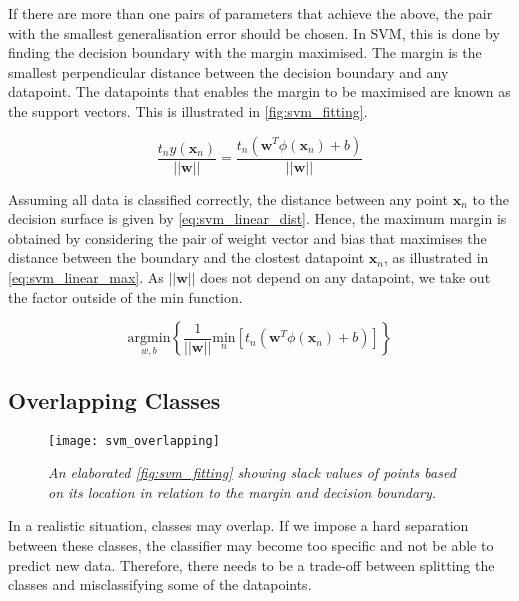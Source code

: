If there are more than one pairs of parameters that achieve the above, the pair with the smallest generalisation error should be chosen. In SVM, this is done by finding the decision boundary with the margin maximised. The margin is the smallest perpendicular distance between the decision boundary and any datapoint. The datapoints that enables the margin to be maximised are known as the support vectors. This is illustrated in \autoref{fig:svm_fitting}.

\begin{equation} \label{eq:svm_linear_dist}
  \frac{t_n y(\mathbf{x}_n)}{||\mathbf{w}||} = \frac{t_n (\mathbf{w}^T \phi(\mathbf{x}_n) + b)}{||\mathbf{w}||}
\end{equation}

Assuming all data is classified correctly, the distance between any point $\mathbf{x}_n$ to the decision surface is given by \autoref{eq:svm_linear_dist}. Hence, the maximum margin is obtained by considering the pair of weight vector and bias that maximises the distance between the boundary and the clostest datapoint $\mathbf{x}_n$, as illustrated in \autoref{eq:svm_linear_max}. As $||\mathbf{w}||$ does not depend on any datapoint, we take out the factor outside of the $\mathrm{min}$ function. 

\begin{equation} \label{eq:svm_linear_max}
  \underset{w,b}{\mathrm{argmin}} \left \{ \frac{1}{||\mathbf{w}||} \underset{n}{\mathrm{min}} \left [ t_n \left (\mathbf{w}^T \phi \left (\mathbf{x}_n \right) + b \right) \right ] \right \} 
\end{equation}

\subsection{Overlapping Classes}

\begin{figure}[H]
  \centering
  \texttt{[image: svm\_overlapping]}
  \caption{\textit{An elaborated \autoref{fig:svm_fitting} showing slack values of points based on its location in relation to the margin and decision boundary.}}
  \label{fig:svm_overlapping}
\end{figure}
In a realistic situation, classes may overlap. If we impose a hard separation between these classes, the classifier may become too specific and not be able to predict new data. Therefore, there needs to be a trade-off between splitting the classes and misclassifying some of the datapoints. 

